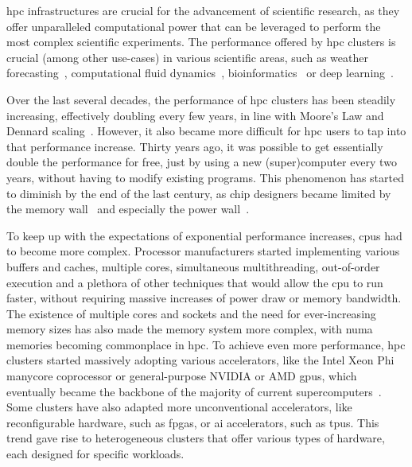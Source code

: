 \gls{hpc} infrastructures are crucial for the advancement of scientific
research, as they offer unparalleled computational power that can be leveraged to perform the most
complex scientific experiments. The performance offered by \gls{hpc} clusters is
crucial (among other use-cases) in various scientific areas, such as weather
forecasting~\cite{wrf}, computational fluid dynamics~\cite{cfd},
bioinformatics~\cite{bioinformatics} or deep learning~\cite{hpcdl}.

Over the last several decades, the performance of \gls{hpc} clusters has been steadily
increasing, effectively doubling every few years, in line with Moore's Law and Dennard
scaling~\cite{mooreslaw}. However, it also became more difficult for \gls{hpc}
users to tap into that performance increase. Thirty years ago, it was possible to get essentially
double the performance for free, just by using a new (super)computer every two years, without
having to modify existing programs. This phenomenon has started to diminish by the end of the last
century, as chip designers became limited by the memory wall~\cite{memorywall} and especially
the power wall~\cite{powerwall}.

To keep up with the expectations of exponential performance increases, \glspl{cpu} had
to become more complex. Processor manufacturers started implementing various buffers and caches,
multiple cores, simultaneous multithreading, out-of-order execution and a plethora of other
techniques that would allow the \gls{cpu} to run faster, without requiring massive
increases of power draw or memory bandwidth. The existence of multiple cores and sockets and the
need for ever-increasing memory sizes has also made the memory system more complex, with
\gls{numa} memories becoming commonplace in \gls{hpc}. To achieve even
more performance, \gls{hpc} clusters started massively adopting various accelerators,
like the Intel Xeon Phi~\cite{xeonphi} manycore coprocessor or general-purpose NVIDIA or
AMD \glspl{gpu}, which eventually became the backbone of the majority of current
supercomputers~\cite{top500gpu}. Some clusters have also adapted more unconventional
accelerators, like reconfigurable hardware, such as \glspl{fpga}, or
\gls{ai} accelerators, such as \glspl{tpu}. This trend gave rise to
heterogeneous clusters that offer various types of hardware, each designed for specific workloads.

